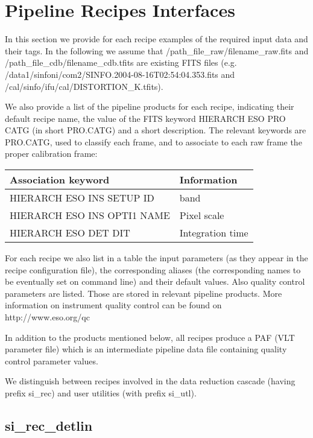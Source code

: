 \section{\label{pipeline_recipe_interfaces}Pipeline Recipes Interfaces} 

In this section we provide for each recipe examples of 
the required input data and 
their tags. In the following  we assume that 
/path\_file\_raw/filename\_raw.fits and
/path\_file\_cdb/filename\_cdb.tfits are existing FITS files
(e.g. /data1/sinfoni/com2/SINFO.2004-08-16T02:54:04.353.fits and
/cal/sinfo/ifu/cal/DISTORTION\_K.tfits).
 
We also provide a list of the pipeline products for each recipe, indicating 
their default recipe name,  
the value of the FITS keyword HIERARCH ESO PRO CATG (in short PRO.CATG) and a 
short description. The relevant keywords are PRO.CATG, used to classify each 
frame, and to associate to each raw frame the proper calibration frame:

\begin{longtable}{|l|l|}
\hline
 Association keyword & Information \\
\hline
HIERARCH ESO INS SETUP ID     & band \\
HIERARCH ESO INS OPTI1 NAME   & Pixel scale      \\
HIERARCH ESO DET DIT          & Integration time  \\
\hline
\end{longtable}


For each recipe we also list in a table the input parameters (as they
appear in the recipe configuration file), the corresponding aliases
(the corresponding names to be eventually set on command line) and their
default values. Also quality control parameters are listed.
Those are stored in relevant pipeline products.
More information on instrument quality control can be found on 
http://www.eso.org/qc

In addition to the products mentioned below, all recipes produce a PAF
 (VLT parameter file) which is an intermediate pipeline data file
 containing quality control parameter values.

We distinguish between recipes involved in the data reduction cascade 
(having prefix si\_rec) and user utilities (with prefix si\_utl).

\subsection{si\_rec\_detlin}

